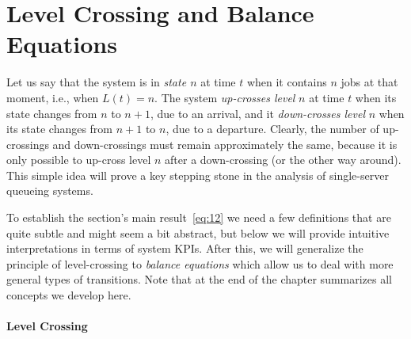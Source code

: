 \section{Level Crossing and Balance Equations}
\label{sec:level-cross-balance}





Let us say that the system is in \emph{state $n$} at time $t$ when it contains $n$ jobs at that moment, i.e., when $L(t) = n$.
The system \emph{up-crosses level} $n$ at time $t$ when its state changes from $n$ to $n+1$, due to an arrival, and it \emph{down-crosses level} $n$ when its state changes from $n+1$ to $n$, due to a departure.
Clearly, the number of up-crossings and down-crossings must remain approximately the same, because it is only possible to up-cross level $n$ after a down-crossing (or the other way around).
This simple idea will prove a key stepping stone in the analysis of single-server queueing systems. 

To establish the section's main result~\cref{eq:12} we need a few definitions that are quite subtle and might seem a bit abstract, but below we will provide intuitive interpretations in terms of system KPIs.
After this, we will generalize the principle of level-crossing to \emph{balance equations} which allow us to deal with more general types of transitions.
Note that  at the end of the chapter summarizes all concepts we develop here.

\paragraph{Level Crossing}

